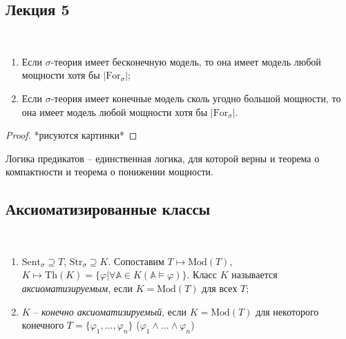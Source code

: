 \subsection{Лекция 5} 

\begin{stat} \ 
     
    \begin{enumerate}
        \item Если $\sigma$-теория имеет бесконечную модель, то она имеет модель любой мощности хотя бы $|\text{For}_\sigma|$; 
        \item Если $\sigma$-теория имеет конечные модель сколь угодно большой мощности, то она имеет модель любой мощности хотя бы $|\text{For}_\sigma|$. 
    \end{enumerate}
\end{stat}

\begin{proof}
    *рисуются картинки*
\end{proof} 

\begin{theorem}
    Логика предикатов -- единственная логика, для которой верны и теорема о компактности и теорема о понижении мощности.
\end{theorem}

\subsection{Аксиоматизированные классы}

\begin{definition} \  

    \begin{enumerate}
        \item $\text{Sent}_\sigma \supseteq T$, $\text{Str}_\sigma \supseteq K$. Сопоставим $T \mapsto \text{Mod}(T)$, $K \mapsto \text{Th}(K) = \{\varphi | \forall \mathbb{A}\in K (\mathbb{A}\models \varphi)\}$. Класс $K$ называется \textit{аксиоматизируемым}, если $K = \text{Mod}(T)$ для всех $T$; 
        \item $K$ -- \textit{конечно аксиоматизируемый}, если $K = \text{Mod}(T)$ для некоторого конечного $T = \{\varphi_1, \ldots, \varphi_n\}$ ($\varphi_1 \wedge \ldots \wedge \varphi_n$)
    \end{enumerate}
\end{definition}

